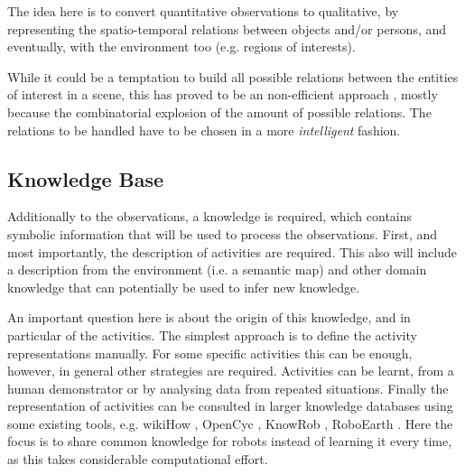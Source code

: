 The idea here is to convert quantitative observations to qualitative, by representing the spatio-temporal relations between objects and/or persons, and eventually, with the environment too (e.g. regions of interests).

While it could be a temptation to build all possible relations between the entities of interest in a scene, this has proved to be an non-efficient approach \citep{Sridhar10_UnsupervisedLearning}, mostly because the combinatorial explosion of the amount  of possible relations. The relations to be handled have to be chosen in a more \textit{intelligent} fashion.


\subsection{Knowledge Base}
Additionally to the observations, a knowledge is required, which contains symbolic information that will be used to process the 
observations.
First, and most importantly, the description of activities are required.
This also will include a description from the environment (i.e. a semantic map) and other domain knowledge that can potentially be used to infer new knowledge.

An important question here is about the origin of this knowledge, and in particular of the activities.
The simplest approach is to define the activity representations manually.
For some specific activities this can be enough, however, in general other strategies are required.
Activities can be learnt, from a human demonstrator or by analysing data from repeated situations.
Finally the representation of activities can be consulted in larger knowledge databases using some existing tools, e.g. wikiHow \citep{web_WikiHow}, OpenCyc \citep{web_OpenCyc}, KnowRob \citep{Tenorth09_Knowrob}, RoboEarth \citep{Zweigle2009_RoboEarth}.
Here the focus is to share common knowledge for robots instead of learning it every time, as this takes considerable computational effort.





